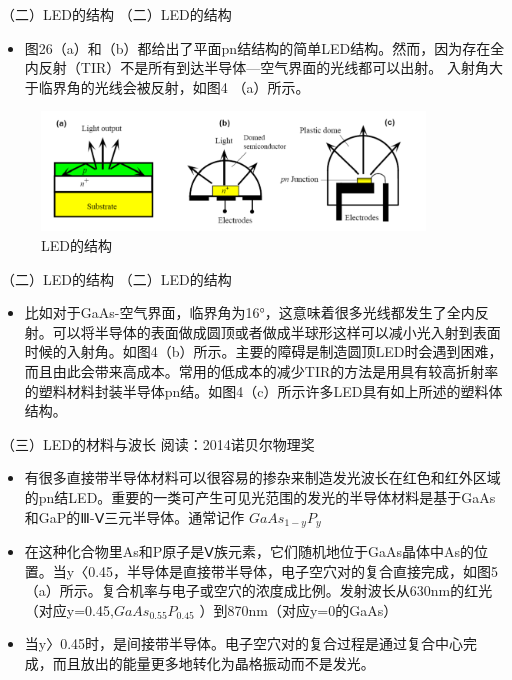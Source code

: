 \documentclass[trans]{beamer} %
\begin{document}
 \begin{frame}{（二）LED的结构}
（二）LED的结构
    \begin{itemize}
        \item  图26（a）和（b）都给出了平面pn结结构的简单LED结构。然而，因为存在全内反射（TIR）不是所有到达半导体—空气界面的光线都可以出射。 入射角大于临界角的光线会被反射，如图4 （a）所示。

    \end{itemize}
    \begin{figure}[htbp] 
    \centering\includegraphics[height=1.25in]{source/ch2/fg227.png} 
    \caption{LED的结构}
    \end{figure}
 \end{frame}
 \begin{frame}{（二）LED的结构}
（二）LED的结构
    \begin{itemize}
        \item  比如对于GaAs-空气界面，临界角为16°，这意味着很多光线都发生了全内反射。可以将半导体的表面做成圆顶或者做成半球形这样可以减小光入射到表面时候的入射角。如图4（b）所示。主要的障碍是制造圆顶LED时会遇到困难，而且由此会带来高成本。常用的低成本的减少TIR的方法是用具有较高折射率的塑料材料封装半导体pn结。如图4（c）所示许多LED具有如上所述的塑料体结构。

    \end{itemize}
 \end{frame}
 \begin{frame}{（三）LED的材料与波长}
阅读：2014诺贝尔物理奖
    \begin{itemize}
        \item  有很多直接带半导体材料可以很容易的掺杂来制造发光波长在红色和红外区域的pn结LED。重要的一类可产生可见光范围的发光的半导体材料是基于GaAs 和GaP的Ⅲ-Ⅴ三元半导体。通常记作  $GaAs_{1-y}P_y$


        \item  在这种化合物里As和P原子是Ⅴ族元素，它们随机地位于GaAs晶体中As的位置。当y〈0.45，半导体是直接带半导体，电子空穴对的复合直接完成，如图5 （a）所示。复合机率与电子或空穴的浓度成比例。发射波长从630nm的红光（对应y=0.45,$GaAs_{0.55}P_{0.45}$
          ）到870nm（对应y=0的GaAs）
        \item  当y〉0.45时，是间接带半导体。电子空穴对的复合过程是通过复合中心完成，而且放出的能量更多地转化为晶格振动而不是发光。 

    \end{itemize}
 \end{frame}
\end{document}
